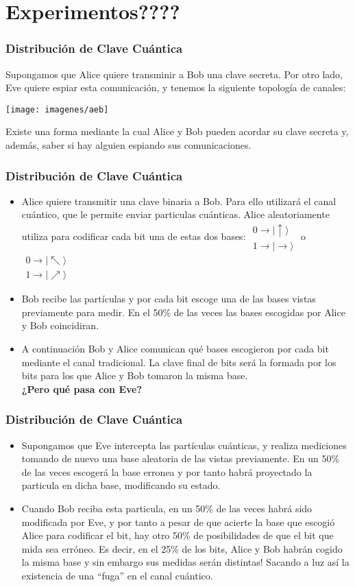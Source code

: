 \documentclass{beamer}
\newcommand{\filados}[2]{ \left. \begin{array}{c}	#1 \\	#2	 \end{array} \right. }
\newcommand{\baseup}{\mid\uparrow\rangle}
\newcommand{\baseright}{\mid\rightarrow\rangle}
\newcommand{\baseupright}{\mid\nearrow\rangle}
\newcommand{\baseupleft}{\mid\nwarrow\rangle}
\begin{document}
\section{Experimentos????}

\begin{frame}
	\frametitle{Distribución de Clave Cuántica}
	Supongamos que Alice quiere transminir a Bob una clave secreta. Por otro lado, Eve quiere espiar esta comunicación, y tenemos la siguiente topología de canales:
	\begin{center}
	\texttt{[image: imagenes/aeb]}\\
	\end{center}
	Existe una forma mediante la cual Alice y Bob pueden acordar su clave secreta y, además, saber si hay alguien espiando sus comunicaciones.
\end{frame}

\begin{frame}
	\frametitle{Distribución de Clave Cuántica}
	\begin{itemize}
	\item Alice quiere transmitir una clave binaria a Bob. Para ello utilizará el canal cuántico, que le permite enviar particulas cuánticas. Alice aleatoriamente utiliza para codificar cada bit una de estas dos bases: 
	$\filados{0\to\baseup}{1\to\baseright}$ o $\filados{0\to\baseupleft}{1\to\baseupright}$
	\item Bob recibe las partículas y por cada bit escoge una de las bases vistas previamente para medir. En el 50\% de las veces las bases escogidas por Alice y Bob coincidiran.
	\item A continuación Bob y Alice comunican qué bases escogieron por cada bit mediante el canal tradicional. La clave final de bits será la formada por los bits para los que Alice y Bob tomaron la misma base. \\ 
	\textbf{¿Pero qué pasa con Eve?}
	\end{itemize}
\end{frame}

\begin{frame}
	\frametitle{Distribución de Clave Cuántica}
	\begin{itemize}
	\item Supongamos que Eve intercepta las partículas cuánticas, y realiza mediciones tomando de nuevo una base aleatoria de las vistas previamente. En un 50\% de las veces escogerá la base erronea y por tanto habrá proyectado la particula en dicha base, modificando su estado. 
	\item Cuando Bob reciba esta particula, en un 50\% de las veces habrá sido modificada por Eve, y por tanto a pesar de que acierte la base que escogió Alice para codificar el bit, hay otro 50\% de posibilidades de que el bit que mida sea erróneo. Es decir, en el 25\% de los bits, Alice y Bob habrán cogido la misma base y sin embargo sus medidas serán distintas! Sacando a luz así la existencia de una ``fuga'' en el canal cuántico.
	\end{itemize}
\end{frame}
\end{document}

